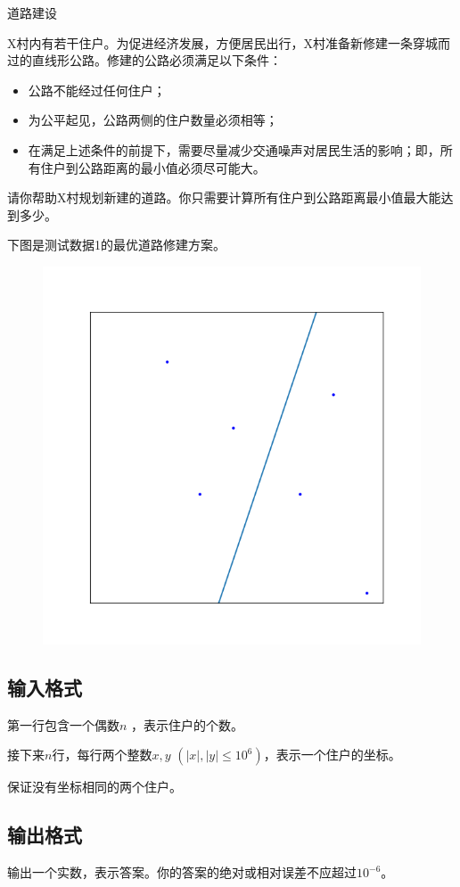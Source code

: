 \begin{Problem}{道路建设}{}

X村内有若干住户。为促进经济发展，方便居民出行，X村准备新修建一条穿城而过的直线形公路。修建的公路必须满足以下条件：

\begin{itemize}
\item 公路不能经过任何住户；
\item 为公平起见，公路两侧的住户数量必须相等；
\item 在满足上述条件的前提下，需要尽量减少交通噪声对居民生活的影响；即，所有住户到公路距离的最小值必须尽可能大。
\end{itemize}

请你帮助X村规划新建的道路。你只需要计算所有住户到公路距离最小值最大能达到多少。

下图是测试数据1的最优道路修建方案。

\begin{figure}[h]
\center
\includegraphics{src/road/01-sample.png}
\end{figure}

\subsection*{输入格式}

第一行包含一个偶数$n$ ，表示住户的个数。

接下来$n$行，每行两个整数$x, y$ $(|x|, |y| \leq 10^6)$，表示一个住户的坐标。

保证没有坐标相同的两个住户。

\subsection*{输出格式}

输出一个实数，表示答案。你的答案的绝对或相对误差不应超过$10^{-6}$。


\end{Problem}
